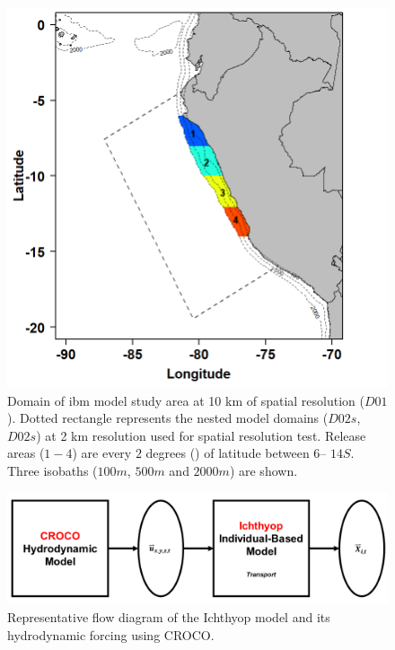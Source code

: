 \begin{figure}[H]
	\includegraphics[width=1.0\textwidth]{figures/Chap2SpawningZone.png}
	\centering
	\caption{Domain of \acrshort{ibm} model study area at 10 km of spatial resolution ($D01$). Dotted rectangle represents the nested model domains ($D02s$, $D02s$) at 2 km resolution used for spatial resolution test. Release areas ($1 - 4$) are every $2$ degrees (\textdegree) of latitude between $6$\textdegree – $14$\textdegree $S$. Three isobaths ($100 m$, $500 m$ and $2000 m$) are shown.}
	\label{Chap2SpawningZone}
\end{figure}

\begin{figure}[H]
	\includegraphics[width=1.0\textwidth]{figures/Chap2Ichthyop.png}
	\centering
	\caption{Representative flow diagram of the Ichthyop model and its hydrodynamic forcing using CROCO.}
	\label{Chap2Ichthyop}
\end{figure}

